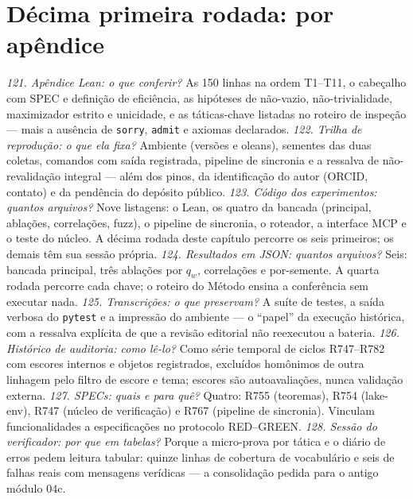 \section{Décima primeira rodada: por apêndice}
\textit{121. Apêndice Lean: o que conferir?} As 150 linhas na ordem T1--T11, o cabeçalho com SPEC e definição de eficiência, as hipóteses de não-vazio, não-trivialidade, maximizador estrito e unicidade, e as táticas-chave listadas no roteiro de inspeção --- mais a ausência de \texttt{sorry}, \texttt{admit} e axiomas declarados.
\textit{122. Trilha de reprodução: o que ela fixa?} Ambiente (versões e oleans), sementes das duas coletas, comandos com saída registrada, pipeline de sincronia e a ressalva de não-revalidação integral --- além dos pinos, da identificação do autor (ORCID, contato) e da pendência do depósito público.
\textit{123. Código dos experimentos: quantos arquivos?} Nove listagens: o Lean, os quatro da bancada (principal, ablações, correlações, fuzz), o pipeline de sincronia, o roteador, a interface MCP e o teste do núcleo. A décima rodada deste capítulo percorre os seis primeiros; os demais têm sua sessão própria.
\textit{124. Resultados em JSON: quantos arquivos?} Seis: bancada principal, três ablações por $q_w$, correlações e por-semente. A quarta rodada percorre cada chave; o roteiro do Método ensina a conferência sem executar nada.
\textit{125. Transcrições: o que preservam?} A suíte de testes, a saída verbosa do \texttt{pytest} e a impressão do ambiente --- o ``papel'' da execução histórica, com a ressalva explícita de que a revisão editorial não reexecutou a bateria.
\textit{126. Histórico de auditoria: como lê-lo?} Como série temporal de ciclos R747--R782 com escores internos e objetos registrados, excluídos homônimos de outra linhagem pelo filtro de escore e tema; escores são autoavaliações, nunca validação externa.
\textit{127. SPECs: quais e para quê?} Quatro: R755 (teoremas), R754 (lake-env), R747 (núcleo de verificação) e R767 (pipeline de sincronia). Vinculam funcionalidades a especificações no protocolo RED--GREEN.
\textit{128. Sessão do verificador: por que em tabelas?} Porque a micro-prova por tática e o diário de erros pedem leitura tabular: quinze linhas de cobertura de vocabulário e seis de falhas reais com mensagens verídicas --- a consolidação pedida para o antigo módulo 04c.
